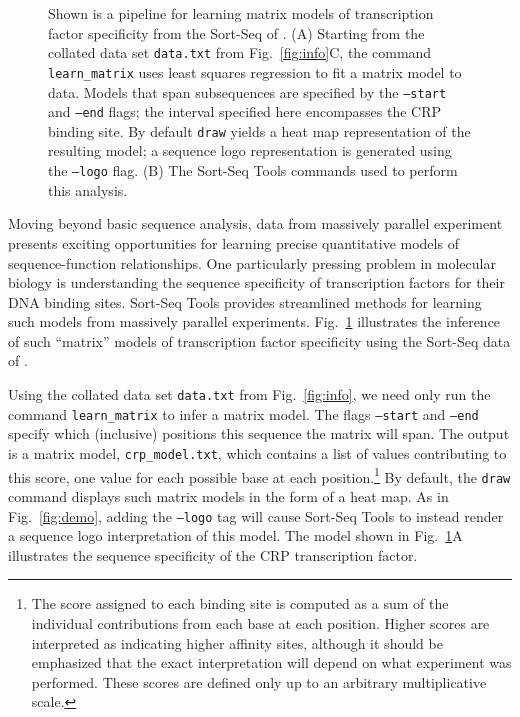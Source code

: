 \documentclass{bmcart}
\newcommand{\fig}[2]{Fig.\ \ref{#1}#2}
\begin{document}
%
%
\begin{figure}[h!]
\caption{
Shown is a pipeline for learning matrix models of transcription factor specificity from the Sort-Seq of \cite{Kinney:2010tn}. 
(A) Starting from the collated data set \texttt{data.txt} from \fig{fig:info}{C}, the command \texttt{learn\_matrix} uses least squares regression to fit a matrix model to data. Models that span subsequences are specified by the \texttt{--start} and \texttt{--end} flags; the interval specified here encompasses the CRP binding site. By default \texttt{draw} yields a heat map representation of the resulting model; a sequence logo representation is generated using the \texttt{--logo} flag. (B) The Sort-Seq Tools commands used to perform this analysis. 
}
\label{fig:model}
\end{figure}

Moving beyond basic sequence analysis, data from massively parallel experiment presents exciting opportunities for learning precise quantitative models of sequence-function relationships. One particularly pressing problem in molecular biology is understanding the sequence specificity of transcription factors for their DNA binding sites.  Sort-Seq Tools provides streamlined methods for learning such models from massively parallel experiments. \fig{fig:model}{} illustrates the inference of such ``matrix'' models of transcription factor specificity using the Sort-Seq data of \cite{Kinney:2010tn}. 

Using the collated data set \texttt{data.txt} from \fig{fig:info}, we need only run the command \texttt{learn\_matrix} to infer a matrix model. The flags \texttt{--start} and \texttt{--end} specify which (inclusive) positions this sequence the matrix will span. The output is a matrix model, \texttt{crp\_model.txt}, which contains a list of values contributing to this score, one value for each possible base at each position.\footnote{The score assigned to each binding site is computed as a sum of the individual contributions from each base at each position. Higher scores are interpreted as indicating higher affinity sites, although it should be emphasized that the exact interpretation will depend on what experiment was performed. These scores are defined only up to an arbitrary multiplicative scale.} By default, the \texttt{draw} command displays such matrix models in the form of a heat map. As in \fig{fig:demo}, adding the \texttt{--logo} tag will cause Sort-Seq Tools to instead render a sequence logo interpretation of this model. The model shown in \fig{fig:model}{A} illustrates the sequence specificity of the CRP transcription factor. 
\end{document}
